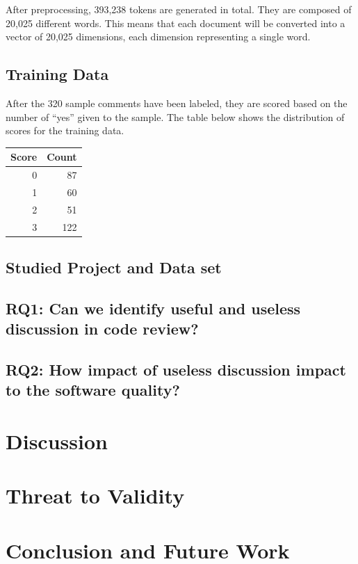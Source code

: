 \documentclass[conference]{IEEEtran}
\begin{document}
After preprocessing, 393,238 tokens are generated in total. They are composed of 20,025 different words.
This means that each document will be converted into a vector of 20,025 dimensions, each dimension representing a single word.



\subsection{Training Data}

After the 320 sample comments have been labeled,
they are scored based on the number of ``yes'' given to the sample.
The table below shows the distribution of scores for the training data.


\begin{center}
\begin{tabular}{|r|r|}
\hline
\bfseries Score & \bfseries Count \\
\hline
0 & 87 \\ 1 & 60 \\ 2 & 51 \\ 3 & 122 \\
\hline
\end{tabular}
\end{center}






\subsection{Studied Project and Data set}
\subsection{RQ1: Can we identify useful and useless discussion in code review?}
\subsection{RQ2: How impact of useless discussion impact to the software quality?}


\section{Discussion}



\section{Threat to Validity}


\section{Conclusion and Future Work}


\IEEEpeerreviewmaketitle



%



\end{document}
